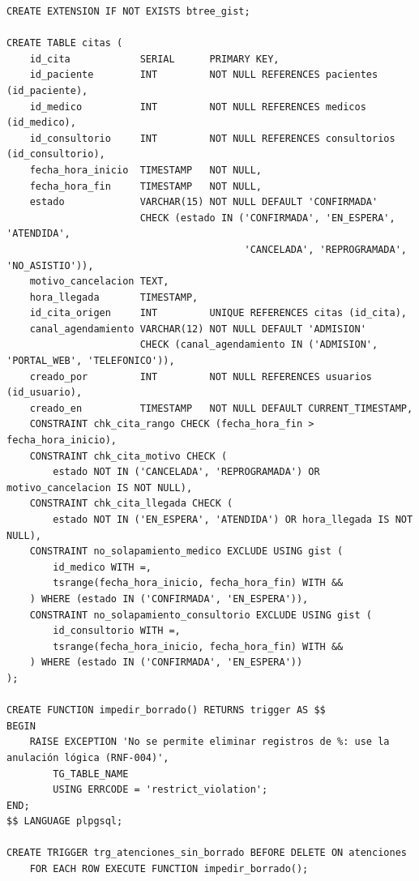 \documentclass[11pt,a4paper]{article}
\begin{document}
\begin{lstlisting}[style=sql, caption={Tabla \texttt{citas} y trigger contra el borrado físico (extracto de \texttt{01-esquema.sql})}, label={lst:ddl}]
CREATE EXTENSION IF NOT EXISTS btree_gist;

CREATE TABLE citas (
    id_cita            SERIAL      PRIMARY KEY,
    id_paciente        INT         NOT NULL REFERENCES pacientes (id_paciente),
    id_medico          INT         NOT NULL REFERENCES medicos (id_medico),
    id_consultorio     INT         NOT NULL REFERENCES consultorios (id_consultorio),
    fecha_hora_inicio  TIMESTAMP   NOT NULL,
    fecha_hora_fin     TIMESTAMP   NOT NULL,
    estado             VARCHAR(15) NOT NULL DEFAULT 'CONFIRMADA'
                       CHECK (estado IN ('CONFIRMADA', 'EN_ESPERA', 'ATENDIDA',
                                         'CANCELADA', 'REPROGRAMADA', 'NO_ASISTIO')),
    motivo_cancelacion TEXT,
    hora_llegada       TIMESTAMP,
    id_cita_origen     INT         UNIQUE REFERENCES citas (id_cita),
    canal_agendamiento VARCHAR(12) NOT NULL DEFAULT 'ADMISION'
                       CHECK (canal_agendamiento IN ('ADMISION', 'PORTAL_WEB', 'TELEFONICO')),
    creado_por         INT         NOT NULL REFERENCES usuarios (id_usuario),
    creado_en          TIMESTAMP   NOT NULL DEFAULT CURRENT_TIMESTAMP,
    CONSTRAINT chk_cita_rango CHECK (fecha_hora_fin > fecha_hora_inicio),
    CONSTRAINT chk_cita_motivo CHECK (
        estado NOT IN ('CANCELADA', 'REPROGRAMADA') OR motivo_cancelacion IS NOT NULL),
    CONSTRAINT chk_cita_llegada CHECK (
        estado NOT IN ('EN_ESPERA', 'ATENDIDA') OR hora_llegada IS NOT NULL),
    CONSTRAINT no_solapamiento_medico EXCLUDE USING gist (
        id_medico WITH =,
        tsrange(fecha_hora_inicio, fecha_hora_fin) WITH &&
    ) WHERE (estado IN ('CONFIRMADA', 'EN_ESPERA')),
    CONSTRAINT no_solapamiento_consultorio EXCLUDE USING gist (
        id_consultorio WITH =,
        tsrange(fecha_hora_inicio, fecha_hora_fin) WITH &&
    ) WHERE (estado IN ('CONFIRMADA', 'EN_ESPERA'))
);

CREATE FUNCTION impedir_borrado() RETURNS trigger AS $$
BEGIN
    RAISE EXCEPTION 'No se permite eliminar registros de %: use la anulación lógica (RNF-004)',
        TG_TABLE_NAME
        USING ERRCODE = 'restrict_violation';
END;
$$ LANGUAGE plpgsql;

CREATE TRIGGER trg_atenciones_sin_borrado BEFORE DELETE ON atenciones
    FOR EACH ROW EXECUTE FUNCTION impedir_borrado();
\end{lstlisting}
\end{document}
